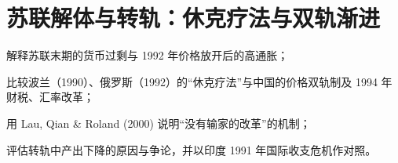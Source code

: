 \chapter{苏联解体与转轨：休克疗法与双轨渐进}\label{ch:transition}

\begin{chapterguide}
\begin{guidegoals}
\item 解释苏联末期的货币过剩与 1992 年价格放开后的高通胀；
\item 比较波兰（1990）、俄罗斯（1992）的“休克疗法”与中国的价格双轨制及 1994 年财税、汇率改革；
\item 用 Lau, Qian \& Roland (2000) 说明“没有输家的改革”的机制；
\item 评估转轨中产出下降的原因与争论，并以印度 1991 年国际收支危机作对照。
\end{guidegoals}
\end{chapterguide}

\chapterstub
